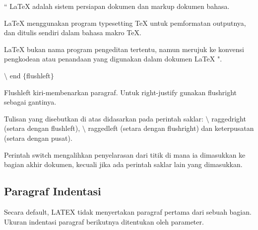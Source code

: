 \begin{itemize}
`` LaTeX adalah sistem persiapan dokumen dan markup dokumen bahasa. \par
\vspace{\baselineskip}
LaTeX menggunakan program typesetting TeX untuk pemformatan outputnya, dan ditulis sendiri dalam bahasa makro TeX.\par
\vspace{\baselineskip}
LaTeX bukan nama program pengeditan tertentu, namun merujuk ke konvensi pengkodean atau penandaan yang digunakan dalam dokumen LaTeX ".\par

\hspace*{0.5in}$\setminus$ end $ \{ $flushleft$ \} $\par
\vspace{\baselineskip}
Flushleft kiri-membenarkan paragraf. Untuk right-justify gunakan flushright sebagai gantinya.\par
\vspace{\baselineskip}
Tulisan yang disebutkan di atas didasarkan pada perintah saklar: $\setminus$ raggedright (setara dengan flushleft), $\setminus$ raggedleft (setara dengan flushright) dan keterpusatan (setara dengan pusat). \par
\vspace{\baselineskip}
Perintah switch mengalihkan penyelarasan dari titik di mana ia dimasukkan ke bagian akhir dokumen, kecuali jika ada perintah saklar lain yang dimasukkan.\par

\vspace{10pt}
	\subsection{Paragraf Indentasi}

Secara default, LATEX tidak menyertakan paragraf pertama dari sebuah bagian. Ukuran indentasi paragraf berikutnya ditentukan oleh parameter. \par


\end{itemize}
